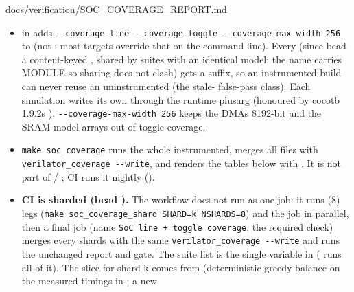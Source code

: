 \begin{relocated}{docs/verification/SOC_COVERAGE_REPORT.md}
\begin{itemize}
\tightlist
\item
   in  adds
  \texttt{-\allowbreak{}-\allowbreak{}coverage-\allowbreak{}line\ -\allowbreak{}-\allowbreak{}coverage-\allowbreak{}toggle\ -\allowbreak{}-\allowbreak{}coverage-\allowbreak{}max-\allowbreak{}width\ 256}
  to  (not : most targets override
  that on the command line). Every  (since bead
   a content-keyed , shared
  by suites with an identical model; the  name carries MODULE
  so sharing does not clash) gets a  suffix, so an
  instrumented build can never reuse an uninstrumented  (the
   stale- false-pass class). Each simulation writes
  its own  through the runtime plusarg
   (honoured by cocotb
  1.9.2\textquotesingle s ).
  \texttt{-\allowbreak{}-\allowbreak{}coverage-\allowbreak{}max-\allowbreak{}width\ 256}
  keeps the DMA\textquotesingle s 8192-bit  and the SRAM
  model arrays out of toggle coverage.
\item
  \texttt{make\ soc\_\allowbreak{}coverage} runs the whole
   instrumented, merges all  files with
  \texttt{verilator\_\allowbreak{}coverage\ -\allowbreak{}-\allowbreak{}write},
  and renders the tables below with
  . It is not part of
   / ; CI runs it nightly
  ().
\item
  \textbf{CI is sharded (bead ).} The workflow does not run
   as one job: it runs  (8)
   legs
  (\texttt{make\ soc\_\allowbreak{}coverage\_\allowbreak{}shard\ SHARD=\allowbreak{}k\ NSHARDS=\allowbreak{}8})
  and the  job in parallel, then a final job (name
  \texttt{SoC\ line\ +\allowbreak{}\ toggle\ coverage}, the required
  check) merges every shard\textquotesingle s  with the same
  \texttt{verilator\_\allowbreak{}coverage\ -\allowbreak{}-\allowbreak{}write}
  and runs the unchanged report and gate. The suite list is the single
  variable  in 
  ( runs all of it). The slice for shard k comes from
   (deterministic greedy balance on the
  measured timings in ; a new

\end{itemize}
\end{relocated}
